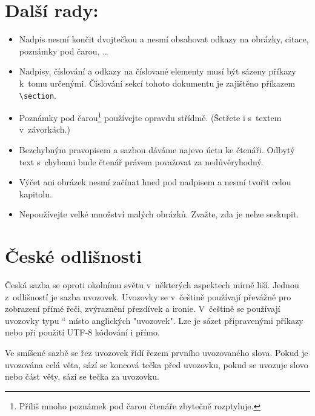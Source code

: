 \documentclass[10pt, a4paper, twocolumn]{article}
\newcommand{\myuv}[1]{\quotedblbase #1\textquotedblleft}
\begin{document}
    \section{Další rady:}
    \label{three}
        \begin{itemize}
            \item Nadpis nesmí končit dvojtečkou a nesmí obsahovat odkazy na obrázky, citace, poznámky pod čarou, \dots

            \item Nadpisy, číslování a odkazy na číslované elementy musí být sázeny příkazy k~tomu určenými. Číslování sekcí tohoto dokumentu je zajištěno příkazem \verb|\section|.

            \item Poznámky pod čarou\footnote[1]{Příliš mnoho poznámek pod čarou čtenáře zbytečně rozptyluje.} používejte opravdu střídmě.
            (Šetřete i s~textem v~závorkách.)

            \item Bezchybným pravopisem a sazbou dáváme najevo úctu ke čtenáři.
            Odbytý text s~chybami bude čtenář právem považovat za nedůvěryhodný.

            \item Výčet ani obrázek nesmí začínat hned pod nadpisem a nesmí tvořit celou kapitolu.

            \item Nepoužívejte velké množství malých obrázků. Zvažte, zda je nelze seskupit.
        \end{itemize}

    \section{České odlišnosti}

        Česká sazba se oproti okolnímu světu v~některých aspektech mírně liší.
        Jednou z~odlišností je sazba uvozovek.
        Uvozovky se v~češtině používají převážně pro zobrazení přímé řeči, zvýraznění přezdívek a ironie.
        V~češtině se používají uvozovky typu \myuv{9966} místo anglických "uvozovek".
        Lze je sázet připravenými příkazy nebo při použití UTF-8 kódování i přímo.

        Ve smíšené sazbě se řez uvozovek řídí řezem prvního uvozovaného slova.
        Pokud je uvozována celá věta, sází se koncová tečka před uvozovku, pokud se uvozuje slovo nebo část věty, sází se tečka za uvozovku.
\end{document}
